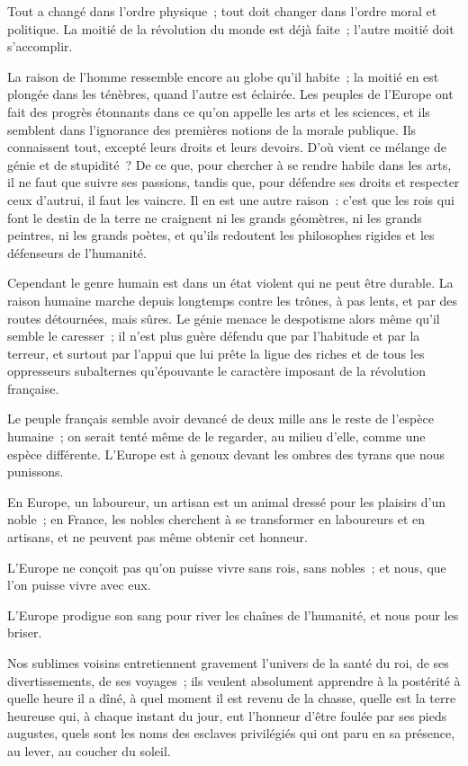 \documentclass[french,twoside]{book} %
\begin{document}
Tout a changé dans l’ordre physique ; tout doit changer dans l’ordre moral et politique. La moitié de la révolution du monde est déjà faite ; l’autre moitié doit s’accomplir.\par
La raison de l’homme ressemble encore au globe qu’il habite ; la moitié en est plongée dans les ténèbres, quand l’autre est éclairée. Les peuples de l’Europe ont fait des progrès étonnants dans ce qu’on appelle les arts et les sciences, et ils semblent dans l’ignorance des premières notions de la morale publique. Ils connaissent tout, excepté leurs droits et leurs devoirs. D’où vient ce mélange de génie et de stupidité ? De ce que, pour chercher à se rendre habile dans les arts, il ne faut que suivre ses passions, tandis que, pour défendre ses droits et respecter ceux d’autrui, il faut les vaincre. Il en est une autre raison : c’est que les rois qui font le destin de la terre ne craignent ni les grands géomètres, ni les grands peintres, ni les grands poètes, et qu’ils redoutent les philosophes rigides et les défenseurs de l’humanité.\par
Cependant le genre humain est dans un état violent qui ne peut être durable. La raison humaine marche depuis longtemps contre les trônes, à pas lents, et par des routes détournées, mais sûres. Le génie menace le despotisme alors même qu’il semble le caresser ; il n’est plus guère défendu que par l’habitude et par la terreur, et surtout par l’appui que lui prête la ligue des riches et de tous les oppresseurs subalternes qu’épouvante le caractère imposant de la révolution française.\par
Le peuple français semble avoir devancé de deux mille ans le reste de l’espèce humaine ; on serait tenté même de le regarder, au milieu d’elle, comme une espèce différente. L’Europe est à genoux devant les ombres des tyrans que nous punissons.\par
En Europe, un laboureur, un artisan est un animal dressé pour les plaisirs d’un noble ; en France, les nobles cherchent à se transformer en laboureurs et en artisans, et ne peuvent pas même obtenir cet honneur.\par
L’Europe ne conçoit pas qu’on puisse vivre sans rois, sans nobles ; et nous, que l’on puisse vivre avec eux.\par
L’Europe prodigue son sang pour river les chaînes de l’humanité, et nous pour les briser.\par
Nos sublimes voisins entretiennent gravement l’univers de la santé du roi, de ses divertissements, de ses voyages ; ils veulent absolument apprendre à la postérité à quelle heure il a dîné, à quel moment il est revenu de la chasse, quelle est la terre heureuse qui, à chaque instant du jour, eut l’honneur d’être foulée par ses pieds augustes, quels sont les noms des esclaves privilégiés qui ont paru en sa présence, au lever, au coucher du soleil.\par
\end{document}
